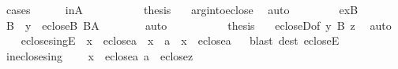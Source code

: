 \begin{isabellebody}
\ {\isacharparenleft}{\kern0pt}cases{\isacharparenright}{\kern0pt}\isanewline
\ \ \ \ \isamarkupfalse%
\ inA\isanewline
\ \ \ \ \isamarkupfalse%
\isanewline
\ \ \ \ \isamarkupfalse%
\ {\isacharquery}{\kern0pt}thesis\ \isamarkupfalse%
\ {}\ arg{\isacharunderscore}{\kern0pt}into{\isacharunderscore}{\kern0pt}eclose\ \isamarkupfalse%
\ auto\isanewline
\ \ \isamarkupfalse%
\isanewline
\ \ \ \ \isamarkupfalse%
\ exB\isanewline
\ \ \ \ \isamarkupfalse%
\ \isamarkupfalse%
\ B\ \ {\isachardoublequoteopen}y\ {\isasymin}\ eclose{\isacharparenleft}{\kern0pt}B{\isacharparenright}{\kern0pt}{\isachardoublequoteclose}\ {\isachardoublequoteopen}B{\isasymin}A{\isachardoublequoteclose}\isanewline
\ \ \ \ \ \ \isamarkupfalse%
\ auto\isanewline
\ \ \ \ \isamarkupfalse%
\isanewline
\ \ \ \ \isamarkupfalse%
\ {\isacharquery}{\kern0pt}thesis\ \isamarkupfalse%
\ {}\ ecloseD{\isacharbrackleft}{\kern0pt}of\ y\ B\ z{\isacharbrackright}{\kern0pt}\ \isamarkupfalse%
\ auto\isanewline
\ \ \isamarkupfalse%
\isanewline
{}\isamarkupfalse%
%
\endisatagproof
{\isafoldproof}%
%
\isadelimproof
\isanewline
%
\endisadelimproof
\isanewline
{}\isamarkupfalse%
\ eclose{\isacharunderscore}{\kern0pt}singE\ {\isacharcolon}{\kern0pt}\ {\isachardoublequoteopen}x\ {\isasymin}\ eclose{\isacharparenleft}{\kern0pt}{\isacharbraceleft}{\kern0pt}a{\isacharbraceright}{\kern0pt}{\isacharparenright}{\kern0pt}\ {\isasymLongrightarrow}\ x\ {\isacharequal}{\kern0pt}\ a\ {\isasymor}\ x\ {\isasymin}\ eclose{\isacharparenleft}{\kern0pt}a{\isacharparenright}{\kern0pt}{\isachardoublequoteclose}\isanewline
%
\isadelimproof
\ \ %
\endisadelimproof
%
\isatagproof
{}\isamarkupfalse%
{\isacharparenleft}{\kern0pt}blast\ dest{\isacharcolon}{\kern0pt}\ ecloseE{\isacharparenright}{\kern0pt}%
\endisatagproof
{\isafoldproof}%
%
\isadelimproof
\isanewline
%
\endisadelimproof
\isanewline
{}\isamarkupfalse%
\ in{\isacharunderscore}{\kern0pt}eclose{\isacharunderscore}{\kern0pt}sing\ {\isacharcolon}{\kern0pt}\isanewline
\ \ \ {\isachardoublequoteopen}x\ {\isasymin}\ eclose{\isacharparenleft}{\kern0pt}{\isacharbraceleft}{\kern0pt}a{\isacharbraceright}{\kern0pt}{\isacharparenright}{\kern0pt}{\isachardoublequoteclose}\ {\isachardoublequoteopen}a\ {\isasymin}\ eclose{\isacharparenleft}{\kern0pt}z{\isacharparenright}{\kern0pt}{\isachardoublequoteclose}\isanewline

\end{isabellebody}
